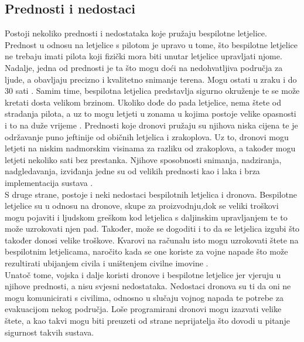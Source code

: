 \documentclass[times, utf8, diplomski]{fer}
\begin{document}
\subsection{Prednosti i nedostaci}
Postoji nekoliko prednosti i nedostataka koje pružaju bespilotne letjelice. Prednost u odnosu na letjelice s pilotom je upravo u tome, što bespilotne letjelice ne trebaju imati pilota 
koji fizički  mora  biti  unutar  letjelice  upravljati  njome.  Nadalje, jedna od prednosti je ta što mogu doći na nedohvatljiva područja za ljude, a obavljaju precizno i kvalitetno snimanje terena. Mogu ostati u zraku i do 30 sati \citep{AdvantagesofUAS}. Samim time, bespilotna letjelica predstavlja sigurno okruženje te se može kretati dosta velikom brzinom. Ukoliko dođe do pada letjelice, nema štete od stradanja pilota, a uz to mogu letjeti u zonama u kojima postoje velike opasnosti i to na duže vrijeme \citep{Soffar}.
Prednosti koje dronovi pružaju su njihova niska cijena te je održavanje puno jeftinije od običnih letjelica i zrakoplova. Uz to, dronovi mogu letjeti na niskim nadmorskim visinama za razliku od zrakoplova, a također mogu letjeti nekoliko sati bez prestanka. Njihove sposobnosti snimanja, nadziranja, nadgledavanja, izviđanja jedne su od velikih prednosti kao i laka i brza implementacija sustava \citep{PhilForHumanity}.\\
S  druge  strane,  postoje  i  neki  nedostaci  bespilotnih  letjelica  i  dronova. Bespilotne letjelice su u odnosu na dronove, skupe za proizvodnju,dok se veliki troškovi mogu pojaviti i ljudskom greškom kod letjelica s daljinskim upravljanjem te to može uzrokovati njen pad. Također, može se dogoditi i to da se letjelica izgubi što također donosi velike troškove. Kvarovi na računalu isto mogu uzrokovati štete na bespilotnim letjelicama, naročito kada se one koriste za vojne napade što može rezultirati ubijanjem civila i uništenjem  civilne  imovine \citep{Soffar}. \\
Unatoč tome, vojska i dalje koristi dronove i  bespilotne letjelice jer vjeruju u njihove prednosti, a nisu svjesni nedostataka. Nedostaci dronova su ti da oni ne mogu komunicirati s civilima, odnosno u slučaju vojnog napada te potrebe za evakuacijom nekog područja. Loše programirani dronovi mogu izazvati velike štete, a kao takvi mogu biti preuzeti od strane neprijatelja što dovodi u pitanje sigurnost takvih sustava. 


 
\end{document}
